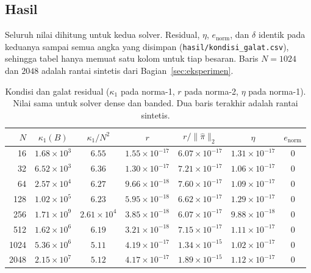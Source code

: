\documentclass[12pt,a4paper]{article}
\numberwithin{equation}{section}
\begin{document}
\subsection{Hasil}\label{subsec:hasilkondisi}
Seluruh nilai dihitung untuk kedua solver. Residual, $\eta$, $e_{\mathrm{norm}}$, dan $\delta$ identik pada keduanya
sampai semua angka yang disimpan (\texttt{hasil/kondisi\_galat.csv}), sehingga tabel hanya memuat satu kolom untuk
tiap besaran. Baris $N=1024$ dan $2048$ adalah rantai sintetis dari Bagian~\ref{sec:eksperimen}.

\begin{table}[H]
\centering
\caption{Kondisi dan galat residual ($\kappa_1$ pada norma-1, $r$ pada norma-2, $\eta$ pada norma-1). Nilai sama untuk
solver dense dan banded. Dua baris terakhir adalah rantai sintetis.}
\label{tab:kondisi}
\small
\setlength{\tabcolsep}{5pt}
\begin{tabular}{rcccccc}
\toprule
$N$ & $\kappa_1(B)$ & $\kappa_1/N^2$ & $r$ & $r/\lVert\hat\pi\rVert_2$ & $\eta$ & $e_{\mathrm{norm}}$\\
\midrule
16 & $1.68\times10^{3}$ & $6.55$ & $1.55\times10^{-17}$ & $6.07\times10^{-17}$ & $1.31\times10^{-17}$ & $0$ \\
32 & $6.52\times10^{3}$ & $6.36$ & $1.30\times10^{-17}$ & $7.21\times10^{-17}$ & $1.06\times10^{-17}$ & $0$ \\
64 & $2.57\times10^{4}$ & $6.27$ & $9.66\times10^{-18}$ & $7.60\times10^{-17}$ & $1.09\times10^{-17}$ & $0$ \\
128 & $1.02\times10^{5}$ & $6.23$ & $5.95\times10^{-18}$ & $6.62\times10^{-17}$ & $1.29\times10^{-17}$ & $0$ \\
256 & $1.71\times10^{9}$ & $2.61\times10^{4}$ & $3.85\times10^{-18}$ & $6.07\times10^{-17}$ & $9.88\times10^{-18}$ & $0$ \\
512 & $1.62\times10^{6}$ & $6.19$ & $3.21\times10^{-18}$ & $7.15\times10^{-17}$ & $1.11\times10^{-17}$ & $0$ \\
\midrule
1024 & $5.36\times10^{6}$ & $5.11$ & $4.19\times10^{-17}$ & $1.34\times10^{-15}$ & $1.02\times10^{-17}$ & $0$ \\
2048 & $2.15\times10^{7}$ & $5.12$ & $4.17\times10^{-17}$ & $1.89\times10^{-15}$ & $1.12\times10^{-17}$ & $0$ \\
\bottomrule
\end{tabular}
\end{table}
\end{document}
